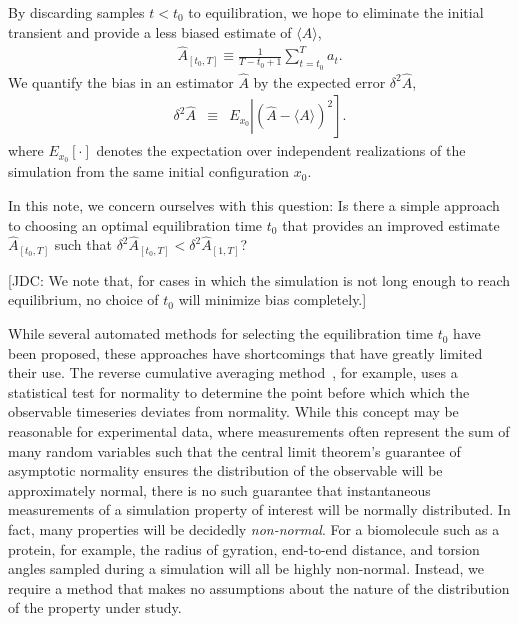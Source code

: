 \documentclass[aps,pre,twocolumn,nofootinbib,superscriptaddress,linenumbers,11point]{revtex4-1}
\newcommand{\expect}[1]{\langle #1 \rangle}                %
\begin{document}
By discarding samples $t < t_0$ to equilibration, we hope to eliminate the initial transient and provide a less biased estimate of $\expect{A}$,
\begin{eqnarray}
\hat{A}_{[t_0,T]} \equiv \frac{1}{T-t_0+1} \sum_{t=t_0}^T a_t . \label{equation:production-time-average} 
\end{eqnarray}
We quantify the bias in an estimator $\hat{A}$ by the expected error $\delta^2 \hat{A}$,
\begin{eqnarray}
\delta^2 \hat{A} &\equiv& E_{x_0} \left| \left( \hat{A} - \expect{A} \right)^2 \right] . \label{equation:error} 
\end{eqnarray}
where $E_{x_0}[\cdot]$ denotes the expectation over independent realizations of the simulation from the same initial configuration $x_0$.

In this note, we concern ourselves with this question: 
Is there a simple approach to choosing an optimal equilibration time $t_0$ that provides an improved estimate $\hat{A}_{[t_0,T]}$ such that $\delta^2 \hat{A}_{[t_0,T]} < \delta^2 \hat{A}_{[1,T]}$?

{\color{red}[JDC: We note that, for cases in which the simulation is not long enough to reach equilibrium, no choice of $t_0$ will minimize bias completely.]}

While several automated methods for selecting the equilibration time $t_0$ have been proposed, these approaches have shortcomings that have greatly limited their use.
The reverse cumulative averaging method~\cite{yang-karplus:2004:jcp:reverse-cumulative-averaging}, for example, uses a statistical test for normality to determine the point before which which the observable timeseries deviates from normality.
While this concept may be reasonable for experimental data, where measurements often represent the sum of many random variables such that the central limit theorem's guarantee of asymptotic normality ensures the distribution of the observable will be approximately normal, there is no such guarantee that instantaneous measurements of a simulation property of interest will be normally distributed.
In fact, many properties will be decidedly \emph{non-normal}.
For a biomolecule such as a protein, for example, the radius of gyration, end-to-end distance, and torsion angles sampled during a simulation will all be highly non-normal.
Instead, we require a method that makes no assumptions about the nature of the distribution of the property under study.

\end{document}
